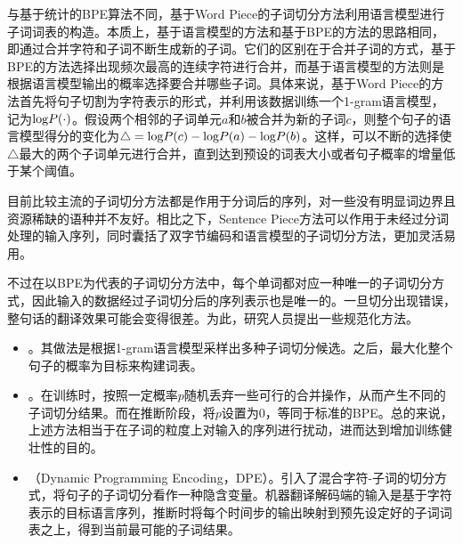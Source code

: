 \parinterval 与基于统计的BPE算法不同，基于Word Piece的子词切分方法利用语言模型进行子词词表的构造。本质上，基于语言模型的方法和基于BPE的方法的思路相同，即通过合并字符和子词不断生成新的子词。它们的区别在于合并子词的方式，基于BPE的方法选择出现频次最高的连续字符进行合并，而基于语言模型的方法则是根据语言模型输出的概率选择要合并哪些子词。具体来说，基于Word Piece的方法首先将句子切割为字符表示的形式，并利用该数据训练一个1-gram语言模型，记为$\textrm{log}{P}(\cdot)$。假设两个相邻的子词单元$a$和$b$被合并为新的子词$c$，则整个句子的语言模型得分的变化为$\triangle=\textrm{log}{P}(c)-\textrm{log}{P}(a)-\textrm{log}{P}(b)$。这样，可以不断的选择使$\triangle$最大的两个子词单元进行合并，直到达到预设的词表大小或者句子概率的增量低于某个阈值。

\parinterval 目前比较主流的子词切分方法都是作用于分词后的序列，对一些没有明显词边界且资源稀缺的语种并不友好。相比之下，Sentence Piece方法可以作用于未经过分词处理的输入序列，同时囊括了双字节编码和语言模型的子词切分方法，更加灵活易用。

\parinterval 不过在以BPE为代表的子词切分方法中，每个单词都对应一种唯一的子词切分方式，因此输入的数据经过子词切分后的序列表示也是唯一的。一旦切分出现错误，整句话的翻译效果可能会变得很差。为此，研究人员提出一些规范化方法。

\begin{itemize}
\vspace{0.5em}
\item {\small{}}。其做法是根据1-gram语言模型采样出多种子词切分候选。之后，最大化整个句子的概率为目标来构建词表。
\vspace{0.5em}
\item {\small{}}。在训练时，按照一定概率$p$随机丢弃一些可行的合并操作，从而产生不同的子词切分结果。而在推断阶段，将$p$设置为0，等同于标准的BPE。总的来说，上述方法相当于在子词的粒度上对输入的序列进行扰动，进而达到增加训练健壮性的目的。
\vspace{0.5em}
\item {\small{}}（Dynamic Programming Encoding，DPE）。引入了混合字符-子词的切分方式，将句子的子词切分看作一种隐含变量。机器翻译解码端的输入是基于字符表示的目标语言序列，推断时将每个时间步的输出映射到预先设定好的子词词表之上，得到当前最可能的子词结果。
\vspace{0.5em}
\end{itemize}

